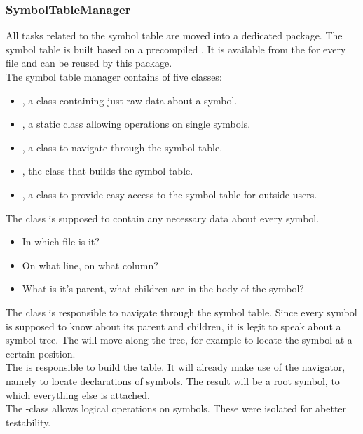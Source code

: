 \subsubsection{SymbolTableManager}
All tasks related to the symbol table are moved into a dedicated package.
The symbol table is built based on a precompiled .
It is available from the  for every file and can be reused by this package.\\

The symbol table manager contains of five classes:
\begin{itemize}
    \item {}, a class containing just raw data about a symbol.
    \item {}, a static class allowing operations on single symbols.
    \item {}, a class to navigate through the symbol table.
    \item {}, the class that builds the symbol table.
    \item {}, a class to provide easy access to the symbol table for outside users.
\end{itemize}

The class  is supposed to contain any necessary data about every symbol.
\begin{itemize}
    \item In which file is it?
    \item On what line, on what column?
    \item What is it's parent, what children are in the body of the symbol?
\end{itemize}

The class  is responsible to navigate through the symbol table.
Since every symbol is supposed to know about its parent and children, it is legit to speak about a symbol tree.
The  will move along the tree, for example to locate the symbol at a certain position.\\

The  is responsible to build the table.
It will already make use of the navigator, namely to locate declarations of symbols.
The result will be a root symbol, to which everything else is attached.\\

The -class allows logical operations on symbols.
These were isolated for abetter testability.\\


